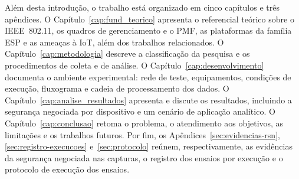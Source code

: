 Além desta introdução, o trabalho está organizado em cinco capítulos e três apêndices. O Capítulo~\ref{cap:fund_teorico} apresenta o referencial teórico sobre o IEEE~802.11, os quadros de gerenciamento e o PMF, as plataformas da família ESP e as ameaças à IoT, além dos trabalhos relacionados. O Capítulo~\ref{cap:metodologia} descreve a classificação da pesquisa e os procedimentos de coleta e de análise. O Capítulo~\ref{cap:desenvolvimento} documenta o ambiente experimental: rede de teste, equipamentos, condições de execução, fluxograma e cadeia de processamento dos dados. O Capítulo~\ref{cap:analise_resultados} apresenta e discute os resultados, incluindo a segurança negociada por dispositivo e um cenário de aplicação analítico. O Capítulo~\ref{cap:conclusao} retoma o problema, o atendimento aos objetivos, as limitações e os trabalhos futuros. Por fim, os Apêndices~\ref{sec:evidencias-rsn}, \ref{sec:registro-execucoes} e~\ref{sec:protocolo} reúnem, respectivamente, as evidências da segurança negociada nas capturas, o registro dos ensaios por execução e o protocolo de execução dos ensaios.
